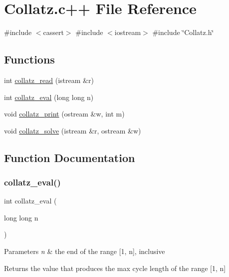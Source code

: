 \hypertarget{_collatz_8c_09_09}{}\section{Collatz.\+c++ File Reference}
\label{_collatz_8c_09_09}
{\ttfamily \#include $<$cassert$>$}\newline
{\ttfamily \#include $<$iostream$>$}\newline
{\ttfamily \#include \char`\"{}Collatz.\+h\char`\"{}}\newline
\subsection*{Functions}
\begin{DoxyCompactItemize}
\item 
int \hyperlink{_collatz_8c_09_09_a359ebd12df3de639cfe17ff5988b59f0}{collatz\+\_\+read} (istream \&r)
\item 
int \hyperlink{_collatz_8c_09_09_a77eaddd3b2f41bf07ed1f1e8e248663a}{collatz\+\_\+eval} (long long n)
\item 
void \hyperlink{_collatz_8c_09_09_a3e9446ea3a53e3b076e00ffa8aab0020}{collatz\+\_\+print} (ostream \&w, int m)
\item 
void \hyperlink{_collatz_8c_09_09_a0ac646d2122741f9a9a52201bf9551cc}{collatz\+\_\+solve} (istream \&r, ostream \&w)
\end{DoxyCompactItemize}


\subsection{Function Documentation}
\mbox{\label{_collatz_8c_09_09_a77eaddd3b2f41bf07ed1f1e8e248663a}} 
\subsubsection{\texorpdfstring{collatz\+\_\+eval()}{collatz\_eval()}}
{\footnotesize\ttfamily int collatz\+\_\+eval (\begin{DoxyParamCaption}\item[{long long}]{n }\end{DoxyParamCaption})}


\begin{DoxyParams}{Parameters}
{\em n} & the end of the range \mbox{[}1, n\mbox{]}, inclusive \\
\hline
\end{DoxyParams}
\begin{DoxyReturn}{Returns}
the value that produces the max cycle length of the range \mbox{[}1, n\mbox{]} 
\end{DoxyReturn}
\mbox{\label{_collatz_8c_09_09_a3e9446ea3a53e3b076e00ffa8aab0020}} 
